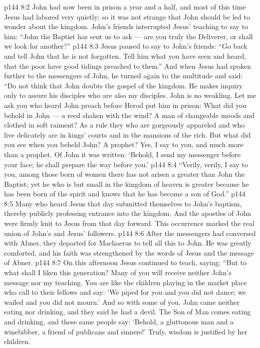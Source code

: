 \vs p144 8:2 John had now been in prison a year and a half, and most of this time Jesus had labored very quietly; so it was not strange that John should be led to wonder about the kingdom. John’s friends interrupted Jesus’ teaching to say to him: “John the Baptist has sent us to ask --- are you truly the Deliverer, or shall we look for another?”
\vs p144 8:3 Jesus paused to say to John’s friends: \textcolor{ubdarkred}{“Go back and tell John that he is not forgotten. Tell him what you have seen and heard, that the poor have good tidings preached to them.”} And when Jesus had spoken further to the messengers of John, he turned again to the multitude and said: \textcolor{ubdarkred}{“Do not think that John doubts the gospel of the kingdom. He makes inquiry only to assure his disciples who are also my disciples. John is no weakling. Let me ask you who heard John preach before Herod put him in prison: What did you behold in John --- a reed shaken with the wind? A man of changeable moods and clothed in soft raiment? As a rule they who are gorgeously appareled and who live delicately are in kings’ courts and in the mansions of the rich. But what did you see when you beheld John? A prophet? Yes, I say to you, and much more than a prophet. Of John it was written: ‘Behold, I send my messenger before your face; he shall prepare the way before you.’}
\vs p144 8:4 \textcolor{ubdarkred}{“Verily, verily, I say to you, among those born of women there has not arisen a greater than John the Baptist; yet he who is but small in the kingdom of heaven is greater because he has been born of the spirit and knows that he has become a son of God.”}
\vs p144 8:5 Many who heard Jesus that day submitted themselves to John’s baptism, thereby publicly professing entrance into the kingdom. And the apostles of John were firmly knit to Jesus from that day forward. This occurrence marked the real union of John’s and Jesus’ followers.
\vs p144 8:6 After the messengers had conversed with Abner, they departed for Machaerus to tell all this to John. He was greatly comforted, and his faith was strengthened by the words of Jesus and the message of Abner.
\vs p144 8:7 On this afternoon Jesus continued to teach, saying: \textcolor{ubdarkred}{“But to what shall I liken this generation? Many of you will receive neither John’s message nor my teaching. You are like the children playing in the market place who call to their fellows and say: ‘We piped for you and you did not dance; we wailed and you did not mourn.’ And so with some of you. John came neither eating nor drinking, and they said he had a devil. The Son of Man comes eating and drinking, and these same people say: ‘Behold, a gluttonous man and a winebibber, a friend of publicans and sinners!’ Truly, wisdom is justified by her children.}
